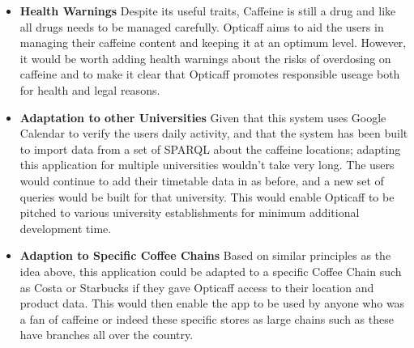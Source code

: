 \begin{itemize}
{	places that had the desired beverage in stock.
	}
	\item{\textbf{Health Warnings}
	Despite its useful traits, Caffeine is still a drug and like all drugs needs to be managed carefully. Opticaff
	aims to aid the users in managing their caffeine content and keeping it at an optimum level. However, it would be
	worth adding health warnings about the risks of overdosing on caffeine and to make it clear that Opticaff
	promotes responsible useage both for health and legal reasons. 
	}
	\item{\textbf{Adaptation to other Universities}
	Given that this system uses Google Calendar to verify the users daily activity, and that the system has been
	built to import data from a set of SPARQL about the caffeine locations; adapting this application for multiple
	universities wouldn't take very long. The users would continue to add their timetable data in as before, and a
	new set of queries would be built for that university. This would enable Opticaff to be pitched to various
	university establishments for minimum additional development time.  
	}
	\item{\textbf{Adaption to Specific Coffee Chains}
	Based on similar principles as the idea above, this application could be adapted to a specific Coffee Chain such as Costa or Starbucks if they gave Opticaff access to their location and product data. This would then enable the app to be used by anyone who was a fan of caffeine or indeed these specific stores as large chains such as these have branches all over the country.
	}
\end{itemize}